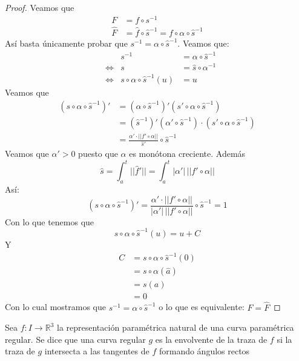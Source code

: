 \begin{proof}
 Veamos que 
 \begin{align*}
   F &= f \circ s^{-1} \\
   \hat{F} &= \hat{f} \circ \hat{s}^{-1} = f \circ \alpha \circ \hat{s}^{-1}
 \end{align*}
 Así basta únicamente probar que $s^{-1} = \alpha \circ \hat{s}^{-1}$. Veamos que:
 \begin{align*}
    &\, &  s^{-1} &= \alpha \circ \hat{s}^{-1} \\
    &\Leftrightarrow &  s&= \hat{s} \circ \alpha^{-1} \\
    &\Leftrightarrow & s \circ \alpha \circ \hat{s}^{-1} (u) &= u 
 \end{align*}
Veamos que  
\begin{align*}
  (s \circ \alpha \circ \hat{s}^{-1})' &= (\alpha \circ \hat{s}^{-1})'(s' \circ
  \alpha \circ \hat{s}^{-1}) \\
                                       &= (\hat{s}^{-1})'(\alpha' \circ
                                       \hat{s}^{-1})\cdot (s' \circ \alpha \circ
                                       \hat{s}^{-1}) \\
                                       &= \frac{\alpha' \cdot ||f' \circ \alpha
                                       ||}{\hat{s}'} \circ \hat{s}^{-1}
\end{align*}
Veamos que $\alpha' >0$ puesto que $\alpha$ es monótona creciente. Además
\[
  \hat{s} = \int_a^t ||\hat{f}'|| = \int_a^t |\alpha'|\,||f' \circ \alpha||
\]
Así:
\[
  (s \circ \alpha \circ \hat{s}^{-1})' = 
  \frac{\alpha' \cdot ||f' \circ \alpha||}{|\alpha'| \, ||f' \circ \alpha||}
  \circ \hat{s}^{-1} = 1
\]
Con lo que tenemos que
\[
  s \circ \alpha \circ \hat{s}^{-1} (u) = u + C
\]
Y
\begin{align*}
  C &= s \circ \alpha \circ \hat{s}^{-1} (0) \\
    &= s \circ \alpha (\hat{a}) \\
    &= s (a) \\
    &= 0
\end{align*}
Con lo cual mostramos que $s^{-1} = \alpha \circ \hat{s}^{-1}$ o lo que es
equivalente:
$F = \hat{F}$
\end{proof}
\begin{definition}
  Sea $f: I \to \mathbb{R}^3$ la representación paramétrica natural de una curva
  paramétrica regular. Se dice que una curva regular $g$ es la envolvente de la
  traza de $f$ si la traza de $g$ intersecta a las tangentes de $f$ formando
  ángulos rectos 
\end{definition}
